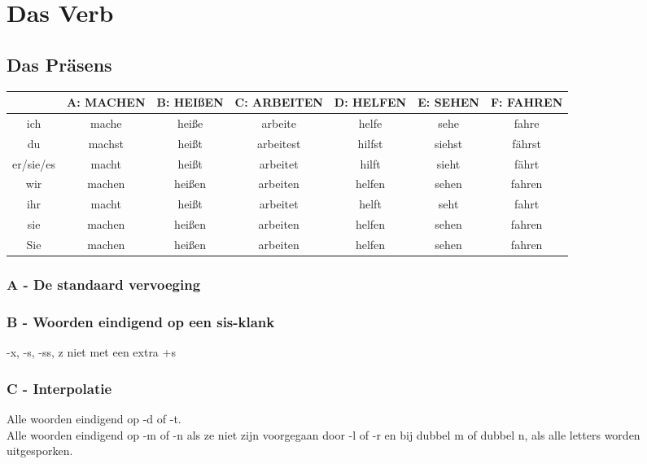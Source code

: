\documentclass[main.tex]{subfiles}
\begin{document}
\chapter{Das Verb}
\section{Das Präsens}
\begin{tabular}{|c|c|c|c|c|c|c|}
\hline 
\rowcolor{gray}
\setlength\extrarowheight{5pt}
 & A: MACHEN & B: HEIßEN & C: ARBEITEN & D: HELFEN & E: SEHEN & F: FAHREN \\ 
\hline 
ich & mache & heiße & arbeite & helfe & sehe & fahre \\ 
\hline 
du & machst & heißt & arbeitest & hilfst & siehst & fährst \\ 
\hline 
er/sie/es & macht & heißt & arbeitet & hilft & sieht & fährt \\ 
\hline 
wir & machen & heißen & arbeiten & helfen & sehen & fahren \\ 
\hline 
ihr & macht & heißt & arbeitet & helft & seht & fahrt \\ 
\hline 
sie & machen & heißen & arbeiten & helfen & sehen & fahren \\ 
\hline 
Sie & machen & heißen & arbeiten & helfen & sehen & fahren \\ 
\hline 
\end{tabular} 

\subsection{A - De standaard vervoeging}

\subsection{B - Woorden eindigend op een sis-klank}
-x, -s, -ss, z niet met een extra +s

\subsection{C - Interpolatie}
Alle woorden eindigend op -d of -t.
\\
Alle woorden eindigend op -m of -n als ze niet zijn voorgegaan door -l of -r en bij dubbel m of dubbel n, als alle letters worden uitgesporken.
\end{document}
